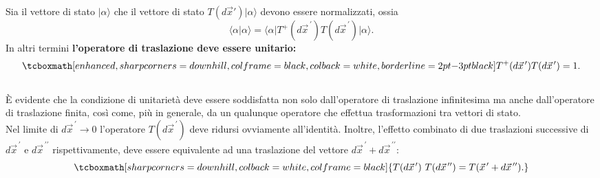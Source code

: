 Sia il vettore di stato $\vert \alpha \rangle$ che il vettore di stato $T(d\vec{x}') \vert \alpha \rangle$ devono essere normalizzati, ossia
	\begin{equation}
		\langle \alpha \vert \alpha \rangle = \langle \alpha \vert T^+(d{\vec{x}}^{\, \prime}) T(d{\vec{x}}^{\, \prime}) \vert \alpha \rangle .
	\end{equation}
In altri termini \textbf{l'operatore di traslazione deve essere unitario:}
	\begin{equation}
		\tcboxmath[enhanced, sharp corners=downhill, colframe=black, colback=white, borderline={2pt}{-3pt}{black}]{
			T^+(d{\vec{x}}^{\, \prime}) T(d{\vec{x}}^{\, \prime}) =1 .
			}
	\end{equation}\\
	
È evidente che la condizione di unitarietà deve essere soddisfatta non solo dall'operatore di traslazione infinitesima ma anche dall'operatore di traslazione finita, così come, più in generale, da un qualunque operatore che effettua trasformazioni tra vettori di stato.\\

Nel limite di $d{\vec{x}}^{\, \prime} \rightarrow 0$ l'operatore $T(d{\vec{x}}^{\, \prime})$ deve ridursi ovviamente all'identità. Inoltre, l'effetto combinato di due traslazioni successive di $d{\vec{x}}^{\, \prime}$ e $d{\vec{x}}^{\, \prime \prime}$ rispettivamente, deve essere equivalente ad una traslazione del vettore $d{\vec{x}}^{\, \prime}+d{\vec{x}}^{\, \prime \prime}$: 
	\begin{equation}
		\tcboxmath[sharp corners=downhill, colback=white, colframe=black]{
			T(d{\vec{x}}^{\, \prime})\ T(d{\vec{x}}^{\, \prime \prime}) = T({\vec{x}}^{\, \prime}+d{\vec{x}}^{\, \prime \prime}).
			}
	\end{equation}\\
	
